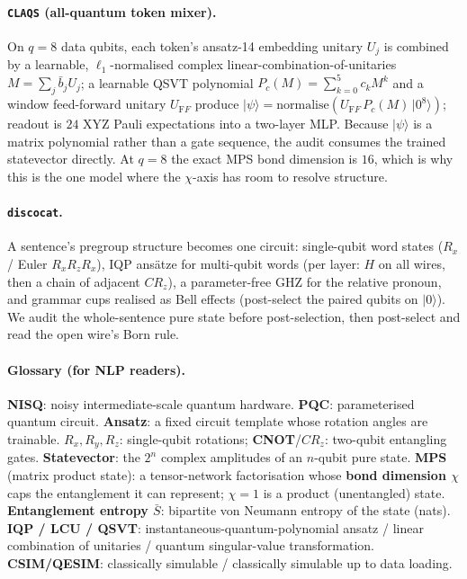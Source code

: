\paragraph{\texttt{CLAQS} (all-quantum token mixer).} On $q{=}8$ data qubits, each token's
ansatz-14 embedding unitary $U_j$ is combined by a learnable, $\ell_1$-normalised complex
linear-combination-of-unitaries $M=\sum_j \bar b_j U_j$; a learnable QSVT polynomial
$P_c(M)=\sum_{k=0}^{5} c_k M^k$ and a window feed-forward unitary $U_{\mathrm FF}$ produce
$|\psi\rangle=\mathrm{normalise}(U_{\mathrm FF}\,P_c(M)\,|0^8\rangle)$; readout is $24$ XYZ Pauli
expectations into a two-layer MLP. Because $|\psi\rangle$ is a matrix polynomial rather than a
gate sequence, the audit consumes the trained statevector directly. At $q{=}8$ the exact MPS
bond dimension is $16$, which is why this is the one model where the $\chi$-axis has room to
resolve structure.

\paragraph{\texttt{discocat}.} A sentence's pregroup structure becomes one circuit: single-qubit
word states ($R_x$ / Euler $R_xR_zR_x$), IQP ansätze for multi-qubit words (per layer: $H$ on
all wires, then a chain of adjacent $C\!R_z$), a parameter-free GHZ for the relative pronoun, and
grammar cups realised as Bell effects (post-select the paired qubits on $|0\rangle$). We audit
the whole-sentence pure state before post-selection, then post-select and read the open wire's
Born rule.

\paragraph{Glossary (for NLP readers).}
\textbf{NISQ}: noisy intermediate-scale quantum hardware.
\textbf{PQC}: parameterised quantum circuit.
\textbf{Ansatz}: a fixed circuit template whose rotation angles are trainable.
\textbf{$R_x,R_y,R_z$}: single-qubit rotations; \textbf{CNOT}/$C\!R_z$: two-qubit entangling gates.
\textbf{Statevector}: the $2^n$ complex amplitudes of an $n$-qubit pure state.
\textbf{MPS} (matrix product state): a tensor-network factorisation whose \textbf{bond dimension
$\chi$} caps the entanglement it can represent; $\chi{=}1$ is a product (unentangled) state.
\textbf{Entanglement entropy $\bar S$}: bipartite von Neumann entropy of the state (nats).
\textbf{IQP / LCU / QSVT}: instantaneous-quantum-polynomial ansatz / linear combination of
unitaries / quantum singular-value transformation.
\textbf{CSIM/QESIM}: classically simulable / classically simulable up to data loading.
